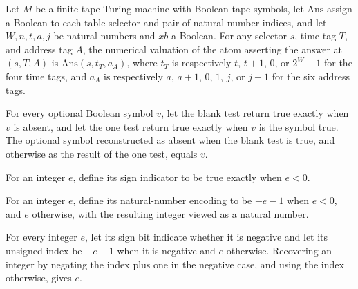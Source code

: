 \begin{theorem}
\label{Complexity.Meyer.NumVal_ans}
\leanok
{}
Let $M$ be a finite-tape Turing machine with Boolean tape symbols, let $\mathrm{Ans}$
assign a Boolean to each table selector and pair of natural-number indices, and let
$W,n,t,a,j$ be natural numbers and $xb$ a Boolean. For any selector $s$, time tag $T$,
and address tag $A$, the numerical valuation of the atom asserting the answer at
$(s,T,A)$ is $\mathrm{Ans}(s,t_T,a_A)$, where $t_T$ is respectively $t$, $t+1$, $0$, or
$2^W-1$ for the four time tags, and $a_A$ is respectively $a$, $a+1$, $0$, $1$, $j$, or
$j+1$ for the six address tags.
\end{theorem}

\begin{theorem}
\label{Complexity.Meyer.decode_symBit}
\leanok
{}
For every optional Boolean symbol $v$, let the blank test return true exactly when $v$
is absent, and let the one test return true exactly when $v$ is the symbol true. The
optional symbol reconstructed as absent when the blank test is true, and otherwise as
the result of the one test, equals $v$.
\end{theorem}

\begin{definition}
\label{Complexity.Meyer.sE}
\leanok
For an integer $e$, define its sign indicator to be true exactly when $e<0$.
\end{definition}

\begin{definition}
\label{Complexity.Meyer.aE}
\leanok
For an integer $e$, define its natural-number encoding to be $-e-1$ when $e<0$, and $e$
otherwise, with the resulting integer viewed as a natural number.
\end{definition}

\begin{theorem}
\label{Complexity.Meyer.edge_c1}
\leanok
{}
For every integer $e$, let its sign bit indicate whether it is negative and let its
unsigned index be $-e-1$ when it is negative and $e$ otherwise. Recovering an integer by
negating the index plus one in the negative case, and using the index otherwise, gives
$e$.
\end{theorem}

